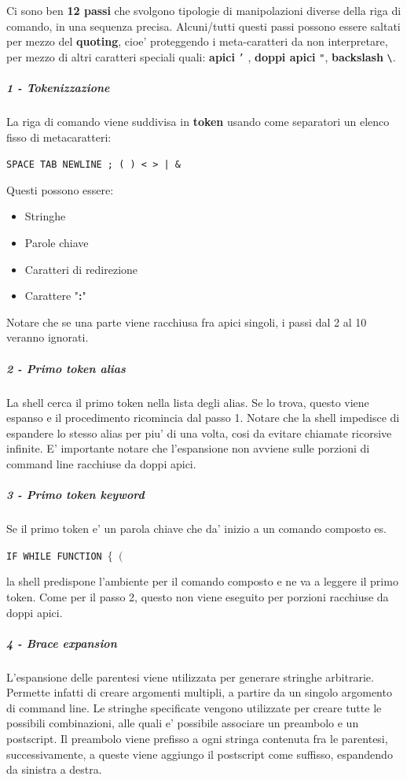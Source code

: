 Ci sono ben \textbf{12 passi} che svolgono tipologie di manipolazioni diverse della riga
di comando, in una sequenza precisa. Alcuni/tutti questi passi possono essere
saltati per mezzo del \textbf{quoting}, cioe' proteggendo i meta-caratteri da non
interpretare, per mezzo di altri caratteri speciali quali:
\textbf{apici} \texttt{'} ,
\textbf{doppi apici} \texttt{"},
\textbf{backslash} \texttt{\textbackslash}.


\subparagraph{1 - Tokenizzazione}
La riga di comando viene suddivisa in \textbf{token} usando come separatori un elenco
fisso di metacaratteri:
\begin{center}
	\texttt{SPACE TAB NEWLINE ; ( ) < > | \& } 
\end{center}
Questi possono essere:
\begin{itemize}
	\item Stringhe
	\item Parole chiave
	\item Caratteri di redirezione
	\item Carattere "\textbf{:}"
\end{itemize}
Notare che se una parte viene racchiusa fra apici singoli, i passi dal 2 al 10 
veranno ignorati.

\subparagraph{2 - Primo token alias}
La shell cerca il primo token nella lista degli alias. Se lo trova, questo viene
espanso e il procedimento ricomincia dal passo 1. Notare che la shell impedisce di 
espandere lo stesso alias per piu' di una volta, cosi da evitare chiamate ricorsive
infinite. E' importante notare che l'espansione non avviene sulle porzioni di command
line racchiuse da doppi apici.


\subparagraph{3 - Primo token keyword}
Se il primo token e' un parola chiave che da' inizio a un comando composto es.
\begin{center}
	\texttt{IF WHILE FUNCTION $\{$ $($}
\end{center}
la shell predispone l'ambiente per il comando composto e ne va a leggere il primo token.
Come per il passo 2, questo non viene eseguito per porzioni racchiuse da doppi apici.

\subparagraph{4 - Brace expansion}
L'espansione delle parentesi viene utilizzata per generare stringhe arbitrarie.
Permette infatti di creare argomenti multipli, a partire da un singolo argomento di 
command line. Le stringhe specificate vengono utilizzate per creare tutte le possibili 
combinazioni, alle quali e' possibile associare un preambolo e un postscript.
Il preambolo viene prefisso a ogni stringa contenuta fra le parentesi, successivamente,
a queste viene aggiungo il postscript come suffisso, espandendo da sinistra a destra.

